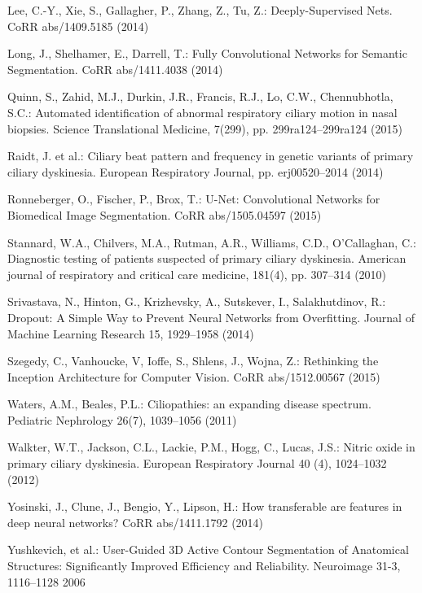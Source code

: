 \documentclass{llncs}
\begin{document}
\begin{thebibliography}{25}
Lee, C.-Y., Xie, S., Gallagher, P., Zhang, Z., Tu, Z.:
Deeply-Supervised Nets.
CoRR abs/1409.5185 (2014)

Long, J., Shelhamer, E., Darrell, T.:
Fully Convolutional Networks for Semantic Segmentation.
CoRR abs/1411.4038 (2014)

Quinn, S., Zahid, M.J., Durkin, J.R., Francis, R.J., Lo, C.W., Chennubhotla, S.C.:
Automated identification of abnormal respiratory ciliary motion in nasal biopsies.
Science Translational Medicine, 7(299), pp. 299ra124--299ra124 (2015)

Raidt, J. et al.:
Ciliary beat pattern and frequency in genetic variants of primary ciliary dyskinesia.
European Respiratory Journal, pp. erj00520--2014 (2014)

Ronneberger, O., Fischer, P., Brox, T.:
U-Net: Convolutional Networks for Biomedical Image Segmentation.
CoRR abs/1505.04597 (2015)

Stannard, W.A., Chilvers, M.A., Rutman, A.R., Williams, C.D., O'Callaghan, C.:
Diagnostic testing of patients suspected of primary ciliary dyskinesia.
American journal of respiratory and critical care medicine, 181(4), pp. 307--314 (2010)

Srivastava, N., Hinton, G., Krizhevsky, A., Sutskever, I., Salakhutdinov, R.:
Dropout: A Simple Way to Prevent Neural Networks from Overfitting.
Journal of Machine Learning Research 15, 1929--1958 (2014)

Szegedy, C., Vanhoucke, V, Ioffe, S., Shlens, J., Wojna, Z.:
Rethinking the Inception Architecture for Computer Vision.
CoRR abs/1512.00567 (2015)

Waters, A.M., Beales, P.L.:
Ciliopathies: an expanding disease spectrum.
Pediatric Nephrology 26(7), 1039--1056 (2011)

Walkter, W.T., Jackson, C.L., Lackie, P.M., Hogg, C., Lucas, J.S.:
Nitric oxide in primary ciliary dyskinesia.
European Respiratory Journal 40 (4), 1024--1032 (2012)

Yosinski, J., Clune, J., Bengio, Y., Lipson, H.:
How transferable are features in deep neural networks?
CoRR abs/1411.1792  (2014)

Yushkevich, et al.:
User-Guided {3D} Active Contour Segmentation of Anatomical Structures: Significantly Improved Efficiency and Reliability.
Neuroimage 31-3, 1116--1128 2006

\end{thebibliography}


\clearpage
{} %
\renewcommand{\indexname}{Author Index}
\printindex
\clearpage
\end{document}
